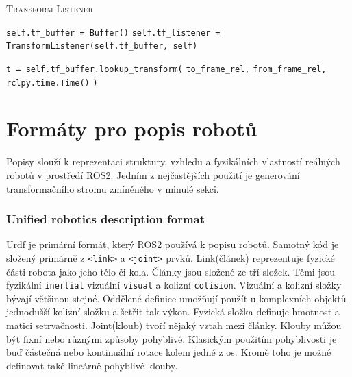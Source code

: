 \begin{algorithm}[h!]
	\label{}
	\caption{\textsc{Transform Listener}}
	
	\DontPrintSemicolon
	\SetAlgoNoLine
	\SetNlSty{}{}{:}
	\SetNlSkip{-1.1em}
	
	\BlankLine \Indp\Indpp
	
	\texttt{self.tf\_buffer = Buffer()}\;
	\texttt{self.tf\_listener = TransformListener(self.tf\_buffer, self)}\;

	\BlankLine
	\texttt{t = self.tf\_buffer.lookup\_transform(}\;
	\Indp\Indp
	\texttt{to\_frame\_rel,}\;
	\texttt{from\_frame\_rel,}\;
	\texttt{rclpy.time.Time()}\;
	\Indm\Indm
	\texttt{)}\;
	
\end{algorithm}

\section{Formáty pro popis robotů}
Popisy slouží k reprezentaci struktury, vzhledu a fyzikálních vlastností reálných robotů v prostředí ROS2. Jedním z nejčastějších použití je generování transformačního stromu zmíněného v minulé sekci.

\subsubsection*{Unified robotics description format}
Urdf je primární formát, který ROS2 používá k popisu robotů. Samotný kód je složený primárně z \verb|<link>| a \verb|<joint>| prvků. Link(článek) reprezentuje fyzické části robota jako jeho tělo či kola. Články jsou složené ze tří složek. Těmi jsou fyzikální \verb|inertial| vizuální \verb|visual| a kolizní \verb|colision|. Vizuální a kolizní složky bývají většinou stejné. Oddělené definice umožňují použít u komplexních objektů jednodušší kolizní složku a šetřit tak výkon. Fyzická složka definuje hmotnost a matici setrvačnosti. Joint(kloub) tvoří nějaký vztah mezi články. Klouby můžou být fixní nebo různými způsoby pohyblivé. Klasickým použitím pohyblivosti je buď částečná nebo kontinuální rotace kolem jedné z os. Kromě toho je možné definovat také lineárně pohyblivé klouby. \cite{ros2_documentation} 

